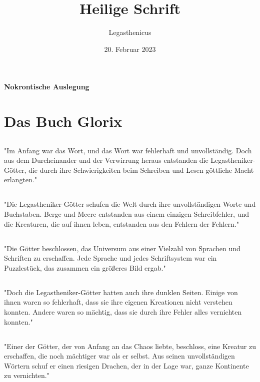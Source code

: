 \documentclass{article}
\title{Heilige Schrift}
\author{Legasthenicus}
\date{20. Februar 2023}
\begin{document}
\maketitle
\vspace*{\fill}
\paragraph{Nokrontische Auslegung}

\newpage
\section{Das Buch Glorix}
\subsection{}
"Im Anfang war das Wort, und das Wort war fehlerhaft und unvollständig. Doch aus dem Durcheinander und der Verwirrung heraus entstanden die Legastheniker-Götter, die durch ihre Schwierigkeiten beim Schreiben und Lesen göttliche Macht erlangten."
\subsection{}
"Die Legastheniker-Götter schufen die Welt durch ihre unvollständigen Worte und Buchstaben. Berge und Meere entstanden aus einem einzigen Schreibfehler, und die Kreaturen, die auf ihnen leben, entstanden aus den Fehlern der Fehlern."
\subsection{}
"Die Götter beschlossen, das Universum aus einer Vielzahl von Sprachen und Schriften zu erschaffen. Jede Sprache und jedes Schriftsystem war ein Puzzlestück, das zusammen ein größeres Bild ergab."
\subsection{}
"Doch die Legastheniker-Götter hatten auch ihre dunklen Seiten. Einige von ihnen waren so fehlerhaft, dass sie ihre eigenen Kreationen nicht verstehen konnten. Andere waren so mächtig, dass sie durch ihre Fehler alles vernichten konnten."
\subsection{}
"Einer der Götter, der von Anfang an das Chaos liebte, beschloss, eine Kreatur zu erschaffen, die noch mächtiger war als er selbst. Aus seinen unvollständigen Wörtern schuf er einen riesigen Drachen, der in der Lage war, ganze Kontinente zu vernichten."
\end{document}
